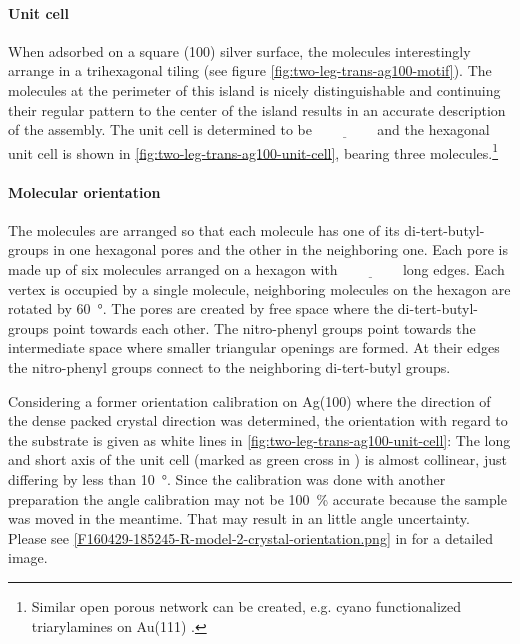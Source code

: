 \paragraph{Unit cell}
When adsorbed on a square (100) silver surface, the molecules interestingly arrange in a trihexagonal tiling (see figure \ref{fig:two-leg-trans-ag100-motif}). The molecules at the perimeter of this island is nicely distinguishable and continuing their regular pattern to the center of the island results in an accurate description of the assembly. The unit cell is determined to be $\underline{\qquad \qquad}$ and the hexagonal unit cell is shown in \autoref{fig:two-leg-trans-ag100-unit-cell}, bearing three molecules.\footnote{Similar open porous network can be created, e.g. cyano functionalized triarylamines on Au(111) \cite{gottardi_cyano-functionalized_2014}.}

\paragraph{Molecular orientation}
The molecules are arranged so that each molecule has one of its di-tert-butyl-groups in one hexagonal pores and the other in the neighboring one. Each pore is made up of six molecules arranged on a hexagon with $\underline{\qquad \qquad}$ long edges. Each vertex is occupied by a single molecule, neighboring molecules on the hexagon are rotated by \SI{60}{\degree}. The pores are created by free space where the di-tert-butyl-groups point towards each other. The nitro-phenyl groups point towards the intermediate space where smaller triangular openings are formed. At their edges the nitro-phenyl groups connect to the neighboring di-tert-butyl groups.

Considering a former orientation calibration on Ag(100) where the direction of the dense packed crystal direction was determined, the orientation with regard to the substrate is given as white lines in \autoref{fig:two-leg-trans-ag100-unit-cell}: The long and short axis of the unit cell (marked as green cross in ) is almost collinear, just differing by less than \SI{10}{\degree}. Since the calibration was done with another preparation the angle calibration may not be \SI{100}{\percent} accurate because the sample was moved in the meantime. That may result in an little angle uncertainty. Please see  \autoref{F160429-185245-R-model-2-crystal-orientation.png} in  for a detailed image.

